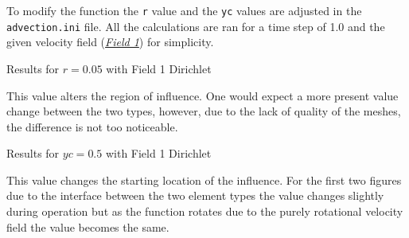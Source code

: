 \documentclass[a4paper, 12pt]{article}
\begin{document}
To modify the function the \verb|r| value and the \verb|yc| values are adjusted in the \verb|advection.ini| file. All the calculations are ran for a time step of 1.0 and the given velocity field (\hyperref[f1]{\textit{Field 1}}) for simplicity.
\begin{table}[H]
    \renewcommand\baselinestretch{1.1}\selectfont
    \centering
    \mbox{}
    \caption{Results for $r = 0.05$ with Field 1 Dirichlet}
\end{table} \par
This value alters the region of influence. One would expect a more present value change between the two types, however, due to the lack of quality of the meshes, the difference is not too noticeable. 
\begin{table}[H]
    \renewcommand\baselinestretch{1.1}\selectfont
    \centering
    \mbox{}
    \caption{Results for $yc = 0.5$ with Field 1 Dirichlet}
\end{table} \par
This value changes the starting location of the influence. For the first two figures due to the interface between the two element types the value changes slightly during operation but as the function rotates due to the purely rotational velocity field the value becomes the same.
\end{document}

